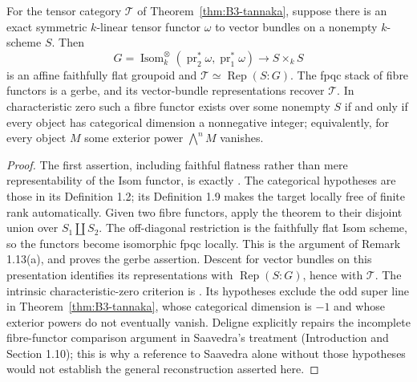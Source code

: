 \begin{theorem}\label{thm:B3-nonneutral}
For the tensor category $\mathcal T$ of
Theorem~\ref{thm:B3-tannaka}, suppose there is an exact symmetric
$k$-linear tensor functor $\omega$ to vector bundles on a nonempty
$k$-scheme $S$. Then
\[
 G=\operatorname{Isom}^{\otimes}_k
       (\operatorname{pr}_2^*\omega,\operatorname{pr}_1^*\omega)
 \longrightarrow S\times_k S
\]
is an affine faithfully flat groupoid and
$\mathcal T\simeq\operatorname{Rep}(S:G)$.
The fpqc stack of fibre functors is a gerbe, and its vector-bundle
representations recover $\mathcal T$.
In characteristic zero such a fibre functor exists over some
nonempty $S$ if and only if every object has categorical dimension
a nonnegative integer; equivalently, for every object $M$ some
exterior power $\bigwedge^nM$ vanishes.
\end{theorem}
\begin{proof}
The first assertion, including faithful flatness rather than mere
representability of the Isom functor, is exactly
\cite[Theorem 1.12, p.~116]{BDeligne1990}. The categorical hypotheses
are those in its Definition 1.2; its Definition 1.9 makes the target
locally free of finite rank automatically. Given two fibre functors,
apply the theorem to their disjoint union over $S_1\amalg S_2$.
The off-diagonal restriction is the faithfully flat Isom scheme,
so the functors become isomorphic fpqc locally. This is the argument
of Remark 1.13(a), and proves the gerbe assertion. Descent for vector
bundles on this presentation identifies its representations with
$\operatorname{Rep}(S:G)$, hence with $\mathcal T$.
The intrinsic characteristic-zero criterion is
\cite[Theorem 7.1, p.~165]{BDeligne1990}. Its hypotheses exclude the
odd super line in Theorem~\ref{thm:B3-tannaka}, whose categorical
dimension is $-1$ and whose exterior powers do not eventually vanish.
Deligne explicitly repairs the incomplete fibre-functor comparison
argument in Saavedra's treatment (Introduction and Section 1.10);
this is why a reference to Saavedra alone without those hypotheses
would not establish the general reconstruction asserted here.
\end{proof}

